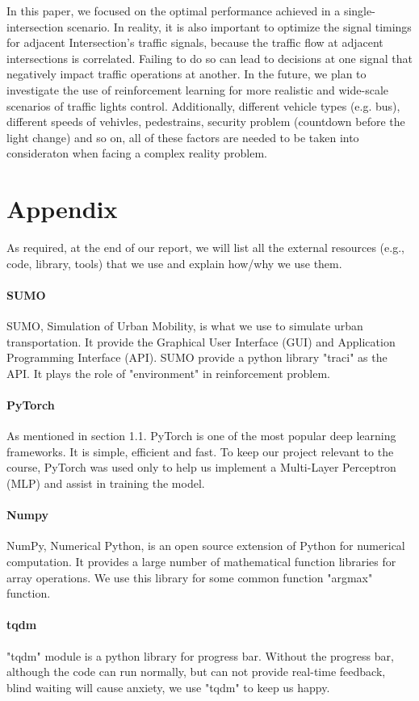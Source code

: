 \documentclass[letterpaper]{article} %
\begin{document}
In this paper, we focused on the optimal performance achieved in a single-intersection scenario. In reality, it is also important to optimize the signal timings for adjacent Intersection's traffic signals, because the traffic flow at adjacent intersections is correlated. Failing to do so can lead to decisions at one signal that negatively impact traffic operations at another. In the future, we plan to investigate the use of reinforcement learning for more realistic and wide-scale scenarios of traffic lights control. Additionally, different vehicle types (e.g. bus), different speeds of vehivles, pedestrains, security problem (countdown before the light change) and so on, all of these factors are needed to be taken into consideraton when facing a complex reality problem.

\section{Appendix}
\hspace*{1em}As required, at the end of our report, we will list all the external resources (e.g., code, library, tools) that we use and explain how/why we use them.
\paragraph{SUMO} SUMO, Simulation of Urban Mobility, is what we use to simulate urban transportation. It provide the Graphical User Interface (GUI) and Application Programming Interface (API). SUMO provide a python library "traci" as the API. It plays the role of "environment" in reinforcement problem.
\paragraph{PyTorch} As mentioned in section 1.1. PyTorch is one of the most popular deep learning frameworks. It is simple, efficient and fast. To keep our project relevant to the course, PyTorch was used only to help us implement a Multi-Layer Perceptron (MLP) and assist in training the model.
\paragraph{Numpy} NumPy, Numerical Python, is an open source extension of Python for numerical computation. It provides a large number of mathematical function libraries for array operations. We use this library for some common function "argmax" function.
\paragraph{tqdm} "tqdm" module is a python library for progress bar. Without the progress bar, although the code can run normally, but can not provide real-time feedback, blind waiting will cause anxiety, we use "tqdm" to keep us happy.
\end{document}
